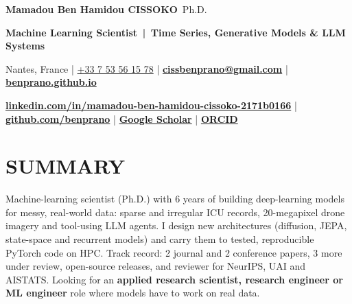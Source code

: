 \documentclass[10pt,a4paper]{article}
\newcommand{\portfolio}{benprano.github.io}   %
\begin{document}
{\LARGE\bfseries Mamadou Ben Hamidou {\color{accent}CISSOKO}}\,{\large\color{muted} Ph.D.}\par\vspace{2pt}
{\color{accent}\bfseries Machine Learning Scientist \,|\, Time Series, Generative Models \& LLM Systems}\par\vspace{3pt}
{\small Nantes, France \;|\; \href{tel:+33753561578}{+33 7 53 56 15 78} \;|\; \href{mailto:cissbenprano@gmail.com}{\textbf{cissbenprano@gmail.com}} \;|\; \href{https://\portfolio}{\textcolor{accent}{\textbf{\portfolio}}}\par
\href{https://www.linkedin.com/in/mamadou-ben-hamidou-cissoko-2171b0166/}{\textcolor{accent}{\textbf{linkedin.com/in/mamadou-ben-hamidou-cissoko-2171b0166}}} \;|\;
\href{https://github.com/benprano}{\textcolor{accent}{\textbf{github.com/benprano}}} \;|\;
\href{https://scholar.google.com/citations?user=k_2SuOkAAAAJ\&hl=en\&oi=sra}{\textcolor{accent}{\textbf{Google Scholar}}} \;|\;
\href{https://orcid.org/0009-0002-1840-9325}{\textcolor{accent}{\textbf{ORCID}}}\par}
\vspace{2pt}{\color{accent}\rule{\linewidth}{1.2pt}}

\section{SUMMARY}
{\small Machine-learning scientist (Ph.D.) with 6 years of building deep-learning models for messy, real-world data: sparse and irregular ICU records, 20-megapixel drone imagery and tool-using LLM agents. I design new architectures (diffusion, JEPA, state-space and recurrent models) and carry them to tested, reproducible PyTorch code on HPC. Track record: 2 journal and 2 conference papers, 3 more under review, open-source releases, and reviewer for NeurIPS, UAI and AISTATS. Looking for an \textbf{applied research scientist, research engineer or ML engineer} role where models have to work on real data.}

\end{document}
